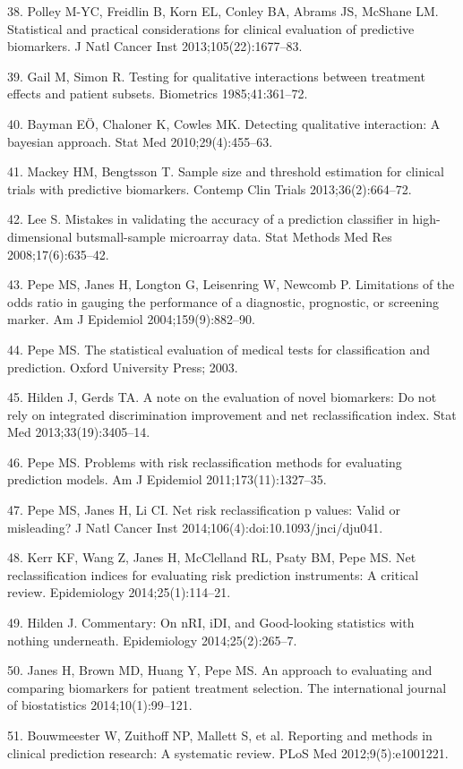 \documentclass[11pt]{article}
\begin{document}
38. Polley M-YC, Freidlin B, Korn EL, Conley BA, Abrams JS, McShane LM.
Statistical and practical considerations for clinical evaluation of
predictive biomarkers. J Natl Cancer Inst 2013;105(22):1677--83.

39. Gail M, Simon R. Testing for qualitative interactions between
treatment effects and patient subsets. Biometrics 1985;41:361--72.

40. Bayman EÖ, Chaloner K, Cowles MK. Detecting qualitative interaction:
A bayesian approach. Stat Med 2010;29(4):455--63.

41. Mackey HM, Bengtsson T. Sample size and threshold estimation for
clinical trials with predictive biomarkers. Contemp Clin Trials
2013;36(2):664--72.

42. Lee S. Mistakes in validating the accuracy of a prediction
classifier in high-dimensional butsmall-sample microarray data. Stat
Methods Med Res 2008;17(6):635--42.

43. Pepe MS, Janes H, Longton G, Leisenring W, Newcomb P. Limitations of
the odds ratio in gauging the performance of a diagnostic, prognostic,
or screening marker. Am J Epidemiol 2004;159(9):882--90.

44. Pepe MS. The statistical evaluation of medical tests for
classification and prediction. Oxford University Press; 2003.

45. Hilden J, Gerds TA. A note on the evaluation of novel biomarkers: Do
not rely on integrated discrimination improvement and net
reclassification index. Stat Med 2013;33(19):3405--14.

46. Pepe MS. Problems with risk reclassification methods for evaluating
prediction models. Am J Epidemiol 2011;173(11):1327--35.

47. Pepe MS, Janes H, Li CI. Net risk reclassification p values: Valid
or misleading? J Natl Cancer Inst 2014;106(4):doi:10.1093/jnci/dju041.

48. Kerr KF, Wang Z, Janes H, McClelland RL, Psaty BM, Pepe MS. Net
reclassification indices for evaluating risk prediction instruments: A
critical review. Epidemiology 2014;25(1):114--21.

49. Hilden J. Commentary: On nRI, iDI, and Good-looking statistics
with nothing underneath. Epidemiology 2014;25(2):265--7.

50. Janes H, Brown MD, Huang Y, Pepe MS. An approach to evaluating and
comparing biomarkers for patient treatment selection. The international
journal of biostatistics 2014;10(1):99--121.

51. Bouwmeester W, Zuithoff NP, Mallett S, et al. Reporting and methods
in clinical prediction research: A systematic review. PLoS Med
2012;9(5):e1001221.
\end{document}

